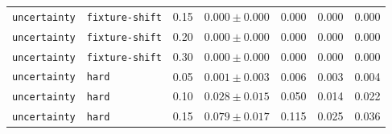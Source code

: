 \documentclass{article}
\begin{document}
\begin{center}
\begin{tabular}{lllcccc}
\texttt{uncertainty} & \texttt{fixture-shift} & 0.15 & $0.000 \pm 0.000$ & 0.000 & 0.000 & 0.000 \\
\texttt{uncertainty} & \texttt{fixture-shift} & 0.20 & $0.000 \pm 0.000$ & 0.000 & 0.000 & 0.000 \\
\texttt{uncertainty} & \texttt{fixture-shift} & 0.30 & $0.000 \pm 0.000$ & 0.000 & 0.000 & 0.000 \\
\texttt{uncertainty} & \texttt{hard} & 0.05 & $0.001 \pm 0.003$ & 0.006 & 0.003 & 0.004 \\
\texttt{uncertainty} & \texttt{hard} & 0.10 & $0.028 \pm 0.015$ & 0.050 & 0.014 & 0.022 \\
\texttt{uncertainty} & \texttt{hard} & 0.15 & $0.079 \pm 0.017$ & 0.115 & 0.025 & 0.036 \\
\bottomrule
\end{tabular}
\end{center}
\end{document}
